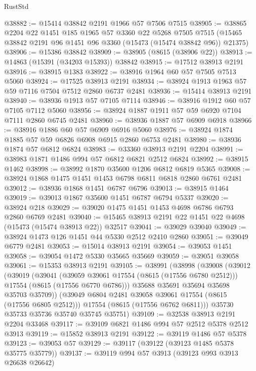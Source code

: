 \begin{lexlean}{RustStd}
\begin{coremodule}
@38882 := @15414 @38842 @2191 @1966 @57 @7506 @7515
@38905 := @38865
    @2204
    @22
    @1451
    @185
    @1965
    @57
    @3360
    @22
    @5268
    @7505
    @7515
    (@15465 @38842 @2191 @96 @1451 @96 @3360 (@15473 (@15474 @38842 @96)) @21375)
@38906 := @15386 @38842
@38909 := @38905 (@8615 (@38906 @22))
@38913 := @14863 (@15391 (@34203 @15393)) @38842
@38915 := @17512 @38913 @2191
@38916 := @38915 @1383
@38922 := @38916 @1964 @60 @57 @7505 @7513 @5060
@38924 := @17525 @38913 @2191
@38934 := @38924 @1913 @1963 @57 @59 @7116 @7504 @7512 @2860 @6737 @2481
@38936 := @15414 @38913 @2191
@38940 := @38936 @1913 @57 @7105 @7114
@38946 := @38916 @1912 @60 @57 @7105 @7112 @5060
@38956 := @38924 @1887 @1911 @57 @59 @6920 @7104 @7111 @2860 @6745 @2481
@38960 := @38936 @1887 @57 @6909 @6918
@38966 := @38916 @1886 @60 @57 @6909 @6916 @5060
@38976 := @38924 @1874 @1885 @57 @59 @6826 @6908 @6915 @2860 @6753 @2481
@38980 := @38936 @1874 @57 @6812 @6824
@38983 := @33360 @38913 @2191 @2204
@38991 := @38983 @1871 @1486 @994 @57 @6812 @6821 @2512 @6824
@38992 := @38915 @1462
@38998 := @38992 @1870 @35600 @1206 @6812 @6819 @5365
@39008 := @38924 @1868 @1475 @1451 @1453 @6798 @6811 @6818 @2860 @6761 @2481
@39012 := @38936 @1868 @1451 @6787 @6796
@39013 := @38915 @1464
@39019 := @39013 @1867 @35600 @1451 @6787 @6794 @5337
@39020 := @38924 @218
@39029 := @39020 @1475 @1451 @1453 @4698 @6786 @6793 @2860 @6769 @2481
@39040 := @15465 @38913 @2191 @22 @1451 @22 @4698 (@15473 (@15474 @38913 @22)) @32517
@39041 := @39029 @39040
@39049 := @38924 @1473 @126 @1451 @44 @5330 @2512 @2410 @2860
@39051 := @39049 @6779 @2481
@39053 := @15014 @38913 @2191
@39054 := @39053 @1451
@39058 := @39054 @1472 @5330 @35665 @35669
@39059 := @39051 @39058
@39061 := @15353 @38913 @2191
@39105 := @38991
    (@38998
      (@39008
        (@39012
          (@39019
            (@39041
              (@39059 @39061 @17554 (@8615 (@17556 @6780 @2512)))
              @17554
              (@8615 (@17556 @6770 @6786)))
            @35688
            @35691
            @35694
            @35698
            @35703
            @35709))
        (@39049 @6804 @2481 @39058 @39061 @17554 (@8615 (@17556 @6805 @2512)))
        @17554
        (@8615 (@17556 @6762 @6811)))
      @35730
      @35733
      @35736
      @35740
      @35745
      @35751)
@39109 := @32538 @38913 @2191 @2204 @33468
@39117 := @39109 @6821 @1486 @994 @57 @2512 @5378 @2512 @3913
@39119 := @15852 @38913 @2191
@39122 := @39119 @1486 @57 @5378
@39123 := @39053 @57
@39129 := @39117 (@39122 (@39123 @1485 @5378 @35775 @35779))
@39137 := @39119 @994 @57 @3913 (@39123 @993 @3913 @26638 @26642)

\end{coremodule}
\end{lexlean}
